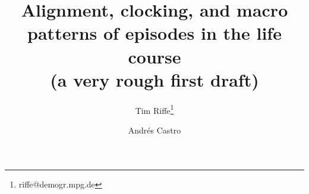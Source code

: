 \documentclass{article}
\begin{document}
\title{Alignment, clocking, and macro patterns of episodes in the life course \\ (a very rough first draft)}
\author[1]{Tim Riffe\thanks{riffe@demogr.mpg.de}}
\author[1]{Andr\'{e}s Castro}
\maketitle

\end{document}
